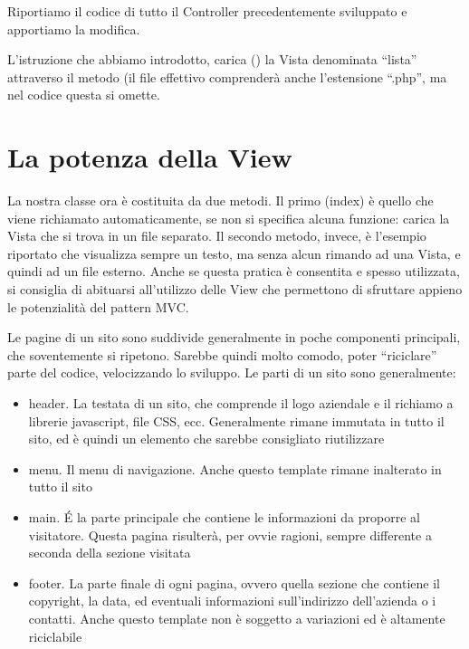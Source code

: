 
Riportiamo il codice di tutto il Controller  precedentemente sviluppato e apportiamo la modifica.


L'istruzione che abbiamo introdotto, carica () la Vista denominata ``lista'' attraverso il metodo (il file effettivo comprenderà anche l'estensione ``.php'', ma nel codice questa si omette.

\section*{La potenza della View}
La nostra classe  ora è costituita da due metodi. Il primo (index) è quello che viene richiamato automaticamente, se non si specifica alcuna funzione: carica la Vista  che si trova in un file separato. Il secondo metodo, invece, è l'esempio riportato che visualizza sempre un testo, ma senza alcun rimando ad una Vista, e quindi ad un file esterno. Anche se questa pratica è consentita e spesso utilizzata, si consiglia di abituarsi all'utilizzo delle View che permettono di sfruttare appieno le potenzialità del pattern \ac{MVC}.

Le pagine di un sito sono suddivide generalmente in poche componenti principali, che soventemente si ripetono. Sarebbe quindi molto comodo, poter ``riciclare'' parte del codice, velocizzando lo sviluppo. Le parti di un sito sono generalmente:

\begin{itemize}
\item header. La testata di un sito, che comprende il logo aziendale e il richiamo a librerie javascript, file \ac{CSS}, ecc. Generalmente rimane immutata in tutto il sito, ed è quindi un elemento che sarebbe consigliato riutilizzare
\item menu. Il menu di navigazione. Anche questo template rimane inalterato in tutto il sito
\item main. \'E la parte principale che contiene le informazioni da proporre al visitatore. Questa pagina risulterà, per ovvie ragioni, sempre differente a seconda della sezione visitata
\item footer. La parte finale di ogni pagina, ovvero quella sezione che contiene il copyright, la data, ed eventuali informazioni sull'indirizzo dell'azienda o i contatti. Anche questo template non è soggetto a variazioni ed è altamente riciclabile
\end{itemize}

